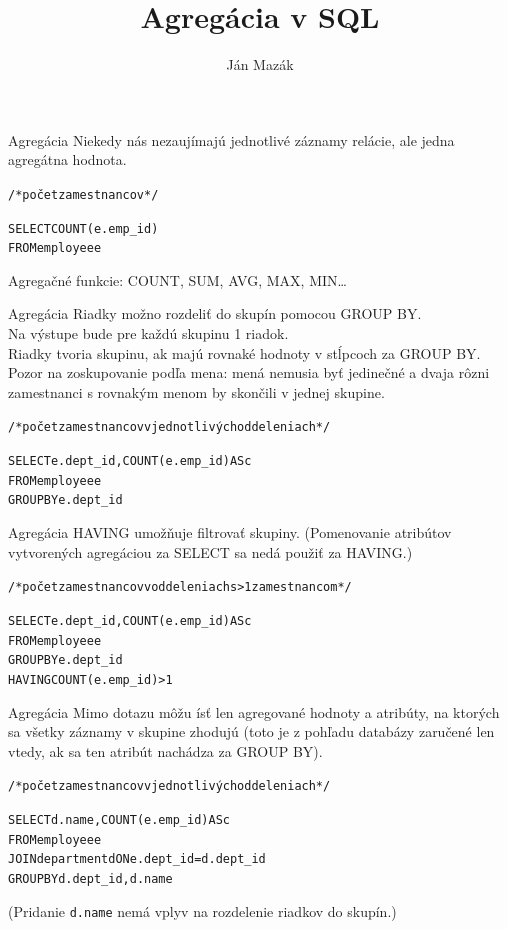 \documentclass[12pt]{beamer}
\title{Agregácia v SQL}
\author{Ján Mazák}
\institute{FMFI UK Bratislava}
\date{}
\def\blue#1{\textcolor{Cerulean}{#1}}
\begin{document}
\frame{\titlepage}



\begin{frame}[fragile]{Agregácia}
Niekedy nás nezaujímajú jednotlivé záznamy relácie, ale jedna agregátna hodnota.
\begin{alltt}
/* počet zamestnancov */

SELECT \alert{COUNT}(e.emp_id)
FROM employee e
\end{alltt}
Agregačné funkcie: COUNT, SUM, AVG, MAX, MIN\dots
\end{frame}

\begin{frame}[fragile]{Agregácia}
Riadky možno rozdeliť do skupín pomocou \alert{GROUP BY}.\\
Na výstupe bude pre každú skupinu 1 riadok.\\
Riadky tvoria skupinu, ak majú rovnaké hodnoty v stĺpcoch za \alert{GROUP BY}. Pozor na zoskupovanie podľa mena: mená nemusia byť jedinečné a dvaja rôzni zamestnanci s rovnakým menom by skončili v jednej skupine.
\begin{alltt}
/* počet zamestnancov v jednotlivých oddeleniach */

SELECT e.dept_id, \alert{COUNT}(e.emp_id) AS c
FROM employee e
\alert{GROUP BY} e.dept_id
\end{alltt}
\end{frame}

\begin{frame}[fragile]{Agregácia}
\blue{HAVING} umožňuje filtrovať skupiny.
(Pomenovanie atribútov vytvorených agregáciou za SELECT sa nedá použiť za \blue{HAVING}.)
{
\small
\begin{alltt}
/* počet zamestnancov v oddeleniach s > 1 zamestnancom */
\end{alltt}
}
\begin{alltt}
SELECT e.dept_id, \alert{COUNT}(e.emp_id) AS c
FROM employee e
\alert{GROUP BY} e.dept_id
\blue{HAVING} COUNT(e.emp_id) > 1
\end{alltt}
\bigskip
\end{frame}

\begin{frame}[fragile]{Agregácia}
Mimo dotazu môžu ísť len agregované hodnoty a atribúty, na ktorých sa všetky záznamy v skupine zhodujú
(toto je z pohľadu databázy zaručené len vtedy, ak sa ten atribút nachádza za GROUP BY).
\begin{alltt}
/* počet zamestnancov v jednotlivých oddeleniach */

SELECT \blue{d.name}, \alert{COUNT}(e.emp_id) AS c
FROM employee e
    JOIN department d ON e.dept_id = d.dept_id
\alert{GROUP BY} d.dept_id, \blue{d.name}
\end{alltt}
(Pridanie \verb|d.name| nemá vplyv na rozdelenie riadkov do skupín.)
\end{frame}
\end{document}
